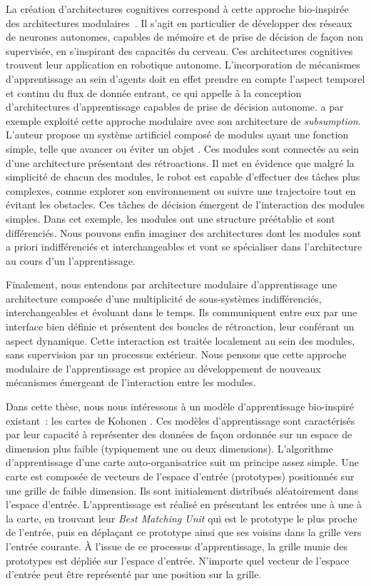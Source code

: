 La création d'architectures cognitives correspond à cette approche bio-inspirée des architectures modulaires~\parencite{Kotseruba201840YO}. Il s'agit en particulier de développer des réseaux de neurones autonomes, capables de mémoire et de prise de décision de façon non supervisée, en s'inspirant des capacités du cerveau.
Ces architectures cognitives trouvent leur application en robotique autonome.
L'incorporation de mécanismes d'apprentissage au sein d'agents doit en effet prendre en compte l'aspect temporel et continu du flux de donnée entrant, ce qui appelle à la conception d'architectures d'apprentissage capables de prise de décision autonome.
\cite{brooks_sumsumption_85} a par exemple exploité cette approche modulaire avec son architecture de \emph{subsumption}. L'auteur propose un système artificiel composé de modules ayant une fonction simple, telle que \og avancer \fg{} ou \og éviter un objet \fg{}. Ces modules sont connectés au sein d'une architecture présentant des rétroactions. Il met en évidence que malgré la simplicité de chacun des modules, le robot est capable d'effectuer des tâches plus complexes, comme explorer son environnement ou suivre une trajectoire tout en évitant les obstacles. Ces tâches de décision émergent de l'interaction des modules simples.
Dans cet exemple, les modules ont une structure préétablie et sont différenciés. Nous pouvons enfin imaginer des architectures dont les modules sont a priori indifférenciés et interchangeables et vont se spécialiser dans l'architecture au cours d'un l'apprentissage. 


Finalement, nous entendons par architecture modulaire d'apprentissage une architecture composée d'une multiplicité de sous-systèmes indifférenciés, interchangeables et évoluant dans le temps.
Ils communiquent entre eux par une interface bien définie et présentent des boucles de rétroaction, leur conférant un aspect dynamique. Cette interaction est traitée localement au sein des modules, sans supervision par un processus extérieur.
Nous pensons que cette approche modulaire de l'apprentissage est propice au développement de nouveaux mécanismes émergeant de l'interaction entre les modules.

Dans cette thèse, nous nous intéressons à un modèle d'apprentissage bio-inspiré existant~: les cartes de Kohonen \parencite{Kohonen1982}. Ces modèles d'apprentissage sont caractérisés par leur capacité à représenter des données de façon ordonnée sur un espace de dimension plus faible (typiquement une ou deux dimensions).
L'algorithme d'apprentissage d'une carte auto-organisatrice suit un principe assez simple. Une carte est composée de vecteurs de l'espace d'entrée (prototypes) positionnés sur une grille de faible dimension.
Ils sont initialement distribués aléatoirement dans l'espace d'entrée. 
L'apprentissage est réalisé en présentant les entrées une à une à la carte, en trouvant leur \emph{Best Matching Unit} qui est le prototype le plus proche de l'entrée, puis en déplaçant ce prototype ainsi que ses voisins dans la grille vers l'entrée courante.
\`A l'issue de ce processus d'apprentissage, la grille munie des prototypes est dépliée sur l'espace d'entrée. N'importe quel vecteur de l'espace d'entrée peut être représenté par une position sur la grille.


